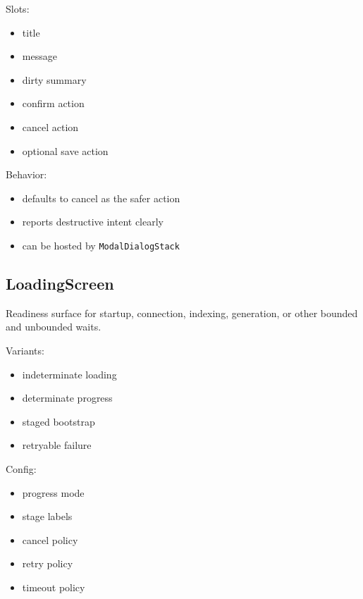 Slots:

\begin{itemize}
\tightlist
\item
  title
\item
  message
\item
  dirty summary
\item
  confirm action
\item
  cancel action
\item
  optional save action
\end{itemize}

Behavior:

\begin{itemize}
\tightlist
\item
  defaults to cancel as the safer action
\item
  reports destructive intent clearly
\item
  can be hosted by \texttt{M\allowbreak{}o\allowbreak{}d\allowbreak{}a\allowbreak{}l\allowbreak{}D\allowbreak{}i\allowbreak{}a\allowbreak{}l\allowbreak{}o\allowbreak{}g\allowbreak{}S\allowbreak{}t\allowbreak{}a\allowbreak{}c\allowbreak{}k}
\end{itemize}

\subsection{LoadingScreen}\label{record-128-loadingscreen}

Readiness surface for startup, connection, indexing, generation, or other bounded and unbounded waits.

Variants:

\begin{itemize}
\tightlist
\item
  indeterminate loading
\item
  determinate progress
\item
  staged bootstrap
\item
  retryable failure
\end{itemize}

Config:

\begin{itemize}
\tightlist
\item
  progress mode
\item
  stage labels
\item
  cancel policy
\item
  retry policy
\item
  timeout policy
\end{itemize}

